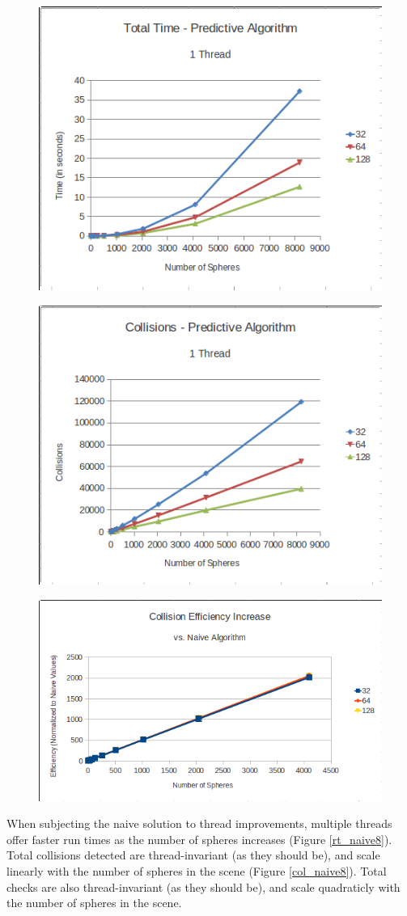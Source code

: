\documentclass[CEJCS,PDF]{cej} %
\begin{document}
\begin{center}
\begin{figure}
	\includegraphics[width=.45\textwidth]{runtime_predictive_1thread.png}
	\label{rt_predict1}
\end{figure}
\end{center}

\begin{center}
\begin{figure}
	\includegraphics[width=.45\textwidth]{collisions_predictive_1thread.png}
	\label{col_predict1}
\end{figure}
\end{center}

\begin{center}
\begin{figure}
	\includegraphics[width=.45\textwidth]{collision_efficiency.png}
	\label{col_eff}
\end{figure}
\end{center}

When subjecting the naive solution to thread improvements, multiple threads offer faster run times as the number of spheres increases (Figure \ref{rt_naive8}).  Total collisions detected are thread-invariant (as they should be), and scale linearly with the number of spheres in the scene (Figure \ref{col_naive8}).  Total checks are also thread-invariant (as they should be), and scale quadraticly with the number of spheres in the scene.
\end{document}
